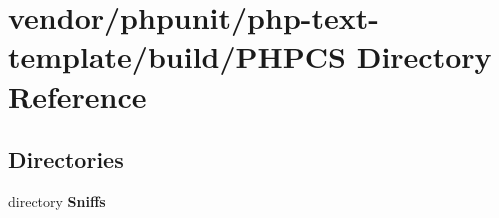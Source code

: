 \section{vendor/phpunit/php-\/text-\/template/build/\+P\+H\+P\+C\+S Directory Reference}
\label{dir_5d4071b9c16173983992b4783dcb4590}
\subsection*{Directories}
\begin{DoxyCompactItemize}
\item 
directory {\bf Sniffs}
\end{DoxyCompactItemize}

